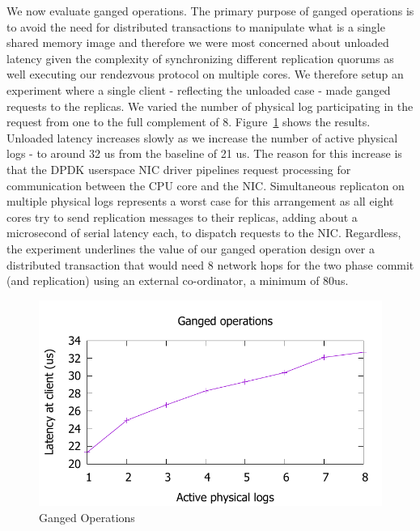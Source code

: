 \documentclass[pageno]{jpaper}
\begin{document}
We now evaluate ganged operations. The primary purpose of
ganged operations is to avoid the need for distributed transactions to
manipulate what is a single shared memory image and therefore we were most
concerned about unloaded latency given the complexity of synchronizing different
replication quorums as well executing our rendezvous protocol on multiple
cores. We therefore setup an experiment where a single client - reflecting the
unloaded case - made ganged requests to the replicas. We varied the number of
physical log participating in the request from one to the full complement of 8.
Figure~\ref{fig:ganged} shows the results. Unloaded
latency increases slowly as we increase the number of active physical logs - to
around 32 us from the baseline of 21 us. The reason for this increase is that
the DPDK userspace NIC driver pipelines request processing for communication
between the CPU core and the NIC. Simultaneous replicaton on multiple physical
logs represents a worst case for this arrangement as all eight cores try to
send replication messages to their replicas, adding about a microsecond of
serial latency each, to dispatch requests to the NIC. Regardless, the experiment
underlines the value of our ganged operation design over a distributed
transaction that would need 8 network hops for the two phase commit (and
replication) using an external co-ordinator, a minimum of 80us.

\begin{figure}
\includegraphics[scale=0.6]{results2/multi.pdf}
\caption{Ganged Operations}
\label{fig:ganged}
\end{figure}
\end{document}
